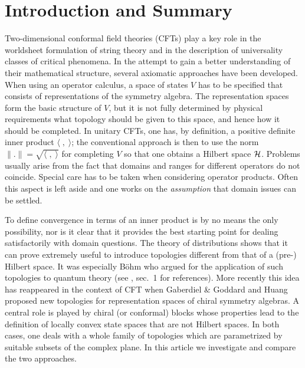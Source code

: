 \documentclass[a4paper,12pt,twoside]{article}
\renewcommand{\b}{\langle}
\renewcommand{\k}{\rangle}
\renewcommand{\c}[1]{{\cal #1}}
\renewcommand{\H}{\c{H}}
\begin{document}
\section{Introduction and Summary}
\label{Introduction_and_Summary}
Two-dimensional
conformal field theories (CFTs) play a key role in the worldsheet
formulation of string theory and in the description of universality classes of critical phenomena.
In the attempt to gain a better
understanding of their mathematical structure, several axiomatic approaches
have been developed.
When using an operator calculus,
a space of states $V$ has to be specified that consists of
representations
of the symmetry algebra. The representation spaces form the basic structure of $V$, but
it is not fully determined by physical requirements
what topology should be given to this space, and hence how it should be completed.
In unitary CFTs, one has, by definition, a positive definite inner product
$\b\;,\;\k$; the conventional approach
is then to use the norm
$\|.\| = \sqrt{\b\;,\;\k}$ for completing $V$ so that one obtains a Hilbert
space $\H$.
Problems usually arise from the fact that domains and ranges for different
operators do not coincide.
Special care has to be taken when considering
operator products. Often this aspect is left aside and
one works on
the {\it assumption} that domain issues can be settled.

To define convergence in terms of an inner product is by no means the only
possibility, nor is it clear that it provides the best starting point for
dealing satisfactorily with domain questions. The theory of distributions
shows that it can prove extremely useful to introduce topologies different
from that of a (pre-) Hilbert space. It was
especially B\"{o}hm who argued for the application of such topologies
to quantum theory (see \cite{Madrid}, sec.\ 1 for references). More recently
this idea has reappeared in the context of CFT when Gaberdiel \& Goddard
\cite{Gaberdiel}
and Huang \cite{Huang} proposed new topologies for
representation spaces of chiral symmetry algebras. A central role is played
by chiral (or conformal) blocks whose properties lead to the definition of
locally convex state spaces that are not Hilbert spaces.
In both cases, one deals with a whole family of topologies which are
parametrized by suitable subsets of the complex plane. In this article we
investigate and compare the two approaches.
\end{document}
